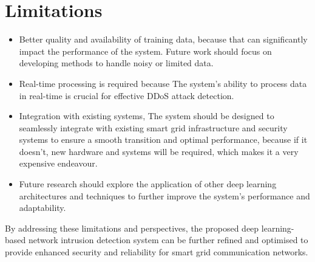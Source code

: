 \section*{Limitations}
\begin  {itemize}
    \item Better quality and availability of training data, because that can significantly impact the performance of the system. Future work should focus on developing methods to handle noisy or limited data.
    \item Real-time processing is required because The system's ability to process data in real-time is crucial for effective DDoS attack detection.
    \item Integration with existing systems, The system should be designed to seamlessly integrate with existing smart grid infrastructure and security systems to ensure a smooth transition and optimal performance, because if it doesn't, new hardware and systems will be required, which makes it a very expensive endeavour.
    \item Future research should explore the application of other deep learning architectures and techniques to further improve the system's performance and adaptability.
\end{itemize}




By addressing these limitations and perspectives, the proposed deep learning-based network intrusion detection system can be further refined and optimised to provide enhanced security and reliability for smart grid communication networks.